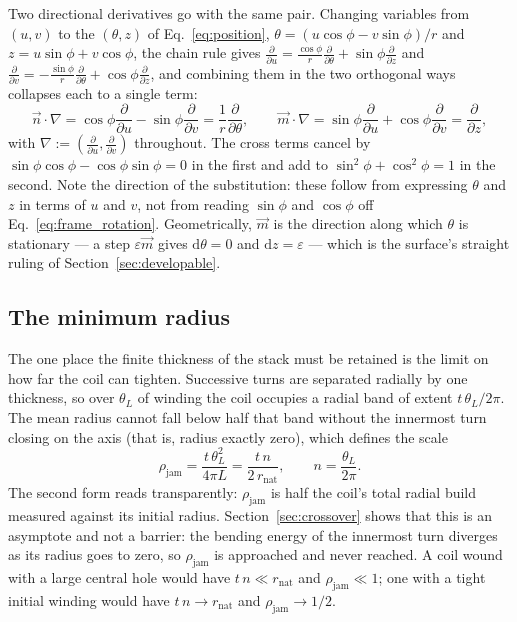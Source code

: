 \documentclass[11pt]{article}
\begin{document}
Two directional derivatives go with the same pair. Changing variables from
$\left(u,v\right)$ to the $\left(\theta,z\right)$ of Eq.~\eqref{eq:position},
$\theta = \left(u\cos\phi - v\sin\phi\right)/r$ and
$z = u\sin\phi + v\cos\phi$, the chain rule gives
$\frac{\partial}{\partial u} = \frac{\cos\phi}{r}
\frac{\partial}{\partial \theta} + \sin\phi\frac{\partial}{\partial z}$ and
$\frac{\partial}{\partial v} = -\frac{\sin\phi}{r}
\frac{\partial}{\partial \theta} + \cos\phi\frac{\partial}{\partial z}$, and
combining them in the two orthogonal ways collapses each to a single term:
\begin{equation}\label{eq:dir_derivs}
    \boxed{\;\vec n\cdot\nabla
      = \cos\phi\frac{\partial}{\partial u} - \sin\phi\frac{\partial}{\partial v}
      = \frac{1}{r}\frac{\partial}{\partial \theta},
    \qquad
    \vec m\cdot\nabla
      = \sin\phi\frac{\partial}{\partial u} + \cos\phi\frac{\partial}{\partial v}
      = \frac{\partial}{\partial z},\;}
\end{equation}
with $\nabla := \left(\frac{\partial}{\partial u},
\frac{\partial}{\partial v}\right)$ throughout. The cross terms cancel by
$\sin\phi\cos\phi - \cos\phi\sin\phi = 0$ in the first and add to
$\sin^{2}\phi + \cos^{2}\phi = 1$ in the second. Note the direction of the
substitution: these follow from expressing $\theta$ and $z$ in terms of $u$ and
$v$, not from reading $\sin\phi$ and $\cos\phi$ off
Eq.~\eqref{eq:frame_rotation}. Geometrically, $\vec m$ is the direction along
which $\theta$ is stationary --- a step $\varepsilon\vec m$ gives
$\mathrm d\theta = 0$ and $\mathrm dz = \varepsilon$ --- which is the surface's
straight ruling of Section~\ref{sec:developable}.


\subsection{The minimum radius}\label{sec:packing}
The one place the finite thickness of the stack must be retained is the limit on
how far the coil can tighten. Successive turns are separated radially by one
thickness, so over $\theta_L$ of winding the coil occupies a radial band of
extent $t\,\theta_L/2\pi$. The mean radius cannot fall below half that band
without the innermost turn closing on the axis (that is, radius exactly zero),
which defines the scale
\begin{equation}\label{eq:rho_jam}
    \boxed{\;\rho_{\mathrm{jam}} = \frac{t\,\theta_L^{2}}{4\pi L}
    = \frac{t\,n}{2\,r_{\mathrm{nat}}}, \qquad
    n = \frac{\theta_L}{2\pi}.\;}
\end{equation}
The second form reads transparently: $\rho_{\mathrm{jam}}$ is half the coil's
total radial build measured against its initial radius. Section~\ref{sec:crossover}
shows that this is an asymptote and not a barrier: the bending energy of the
innermost turn diverges as its radius goes to zero, so $\rho_{\mathrm{jam}}$ is
approached and never reached. A coil wound with a large
central hole would have $t\,n \ll r_{\mathrm{nat}}$ and $\rho_{\mathrm{jam}} \ll 1$; one
with a tight initial winding would have $t\,n \to r_{\mathrm{nat}}$ and
$\rho_{\mathrm{jam}} \to 1/2$.
\end{document}
